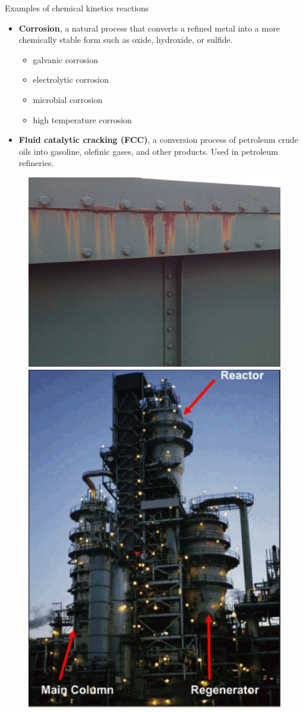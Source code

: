 
\begin{frame}{Examples of chemical kinetics reactions}
%
\lcol

\begin{itemize}
	\item \alert{\textbf{Corrosion}}, a natural process that converts a refined metal into a more chemically stable form such as oxide, hydroxide, or sulfide.
		\begin{itemize}
		\item galvanic corrosion 
		\item electrolytic corrosion
		\item microbial corrosion
		\item high temperature corrosion
	\end{itemize}
	\pause
	\item \alert{\textbf{Fluid catalytic cracking (FCC)}}, a conversion process of petroleum crude oils into gasoline, olefinic gases, and other products. Used in petroleum refineries.
\end{itemize}      

\rcol

\begin{figure}
\centering
\includegraphics[width=0.45\columnwidth]{figures/applications/corrosion.jpg} \\[5pt]
\includegraphics[width=0.45\columnwidth]{figures/applications/fluid-catalytic-cracker}
\end{figure}

\ecol

\end{frame}
